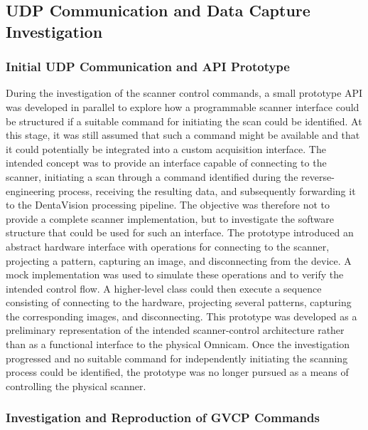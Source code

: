 \subsection{UDP Communication and Data Capture Investigation}

\subsubsection{Initial UDP Communication and API Prototype}

During the investigation of the scanner control commands, a small prototype API was developed in parallel to explore how a programmable scanner interface could be structured if a suitable command for initiating the scan could be identified. At this stage, it was still assumed that such a command might be available and that it could potentially be integrated into a custom acquisition interface. The intended concept was to provide an interface capable of connecting to the scanner, initiating a scan through a command identified during the reverse-engineering process, receiving the resulting data, and subsequently forwarding it to the DentaVision processing pipeline. The objective was therefore not to provide a complete scanner implementation, but to investigate the software structure that could be used for such an interface. The prototype introduced an abstract hardware interface with operations for connecting to the scanner, projecting a pattern, capturing an image, and disconnecting from the device. A mock implementation was used to simulate these operations and to verify the intended control flow. A higher-level  class could then execute a sequence consisting of connecting to the hardware, projecting several patterns, capturing the corresponding images, and disconnecting. This prototype was developed as a preliminary representation of the intended scanner-control architecture rather than as a functional interface to the physical Omnicam. Once the investigation progressed and no suitable command for independently initiating the scanning process could be identified, the prototype was no longer pursued as a means of controlling the physical scanner.

\subsubsection{Investigation and Reproduction of GVCP Commands}

